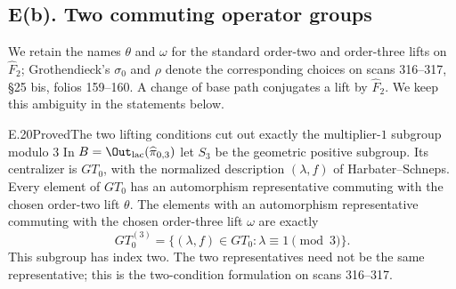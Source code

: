 \subsection{E(b). Two commuting operator groups}

We retain the names $\theta$ and $\omega$ for the standard order-two and order-three lifts on $\widehat F_2$; Grothendieck's $\sigma_0$ and $\rho$ denote the corresponding choices on scans 316--317, \S25 bis, folios 159--160. A change of base path conjugates a lift by $\widehat F_2$. We keep this ambiguity in the statements below.

\begin{claim}{E.20}{Proved}{The two lifting conditions cut out exactly the multiplier-$1$ subgroup modulo $3$}
In $B=\Out_{\rm lac}(\widehat\pi_{0,3})$ let $S_3$ be the geometric positive subgroup. Its centralizer is $GT_0$, with the normalized description $(\lambda,f)$ of Harbater--Schneps. Every element of $GT_0$ has an automorphism representative commuting with the chosen order-two lift $\theta$. The elements with an automorphism representative commuting with the chosen order-three lift $\omega$ are exactly
\[
 GT_0^{(3)}=\{(\lambda,f)\in GT_0:\lambda\equiv1\pmod3\}.
\]
This subgroup has index two. The two representatives need not be the same representative; this is the two-condition formulation on scans 316--317.
\end{claim}
